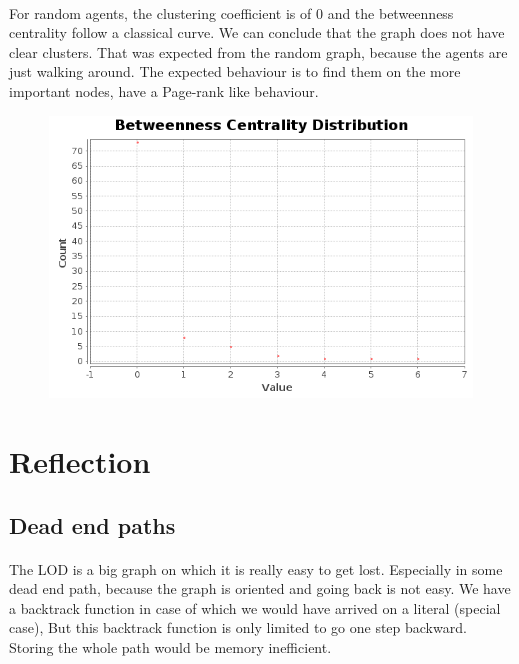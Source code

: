 \documentclass{article}
\begin{document}
		\paragraph{}
			For random agents, the clustering coefficient is of $0$ and the betweenness centrality follow a classical curve.
			We can conclude that the graph does not have clear clusters.
			That was expected from the random graph, because the agents are just walking around.
			The expected behaviour is to find them on the more important nodes, have a Page-rank like behaviour.
		\begin{figure}[!h]
			\includegraphics[width=1\textwidth]{dh_betweenness_centrality_random}
		\end{figure}
		
\section{Reflection}
	\subsection{Dead end paths}
		\paragraph{}
			The LOD is a big graph on which it is really easy to get lost.
			Especially in some dead end path, because the graph is oriented and going back is not easy.
			We have a backtrack function in case of which we would have arrived on a literal (special case),
			But this backtrack function is only limited to go one step backward.
			Storing the whole path would be memory inefficient.
\end{document}
